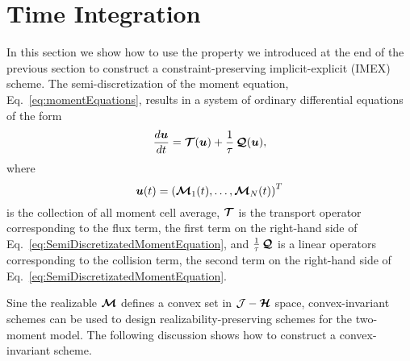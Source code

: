 \section{Time Integration} \label{se:TimeIntegration}

In this section we show how to use the property we introduced at the end of the previous section to construct a constraint-preserving implicit-explicit (IMEX) scheme.
The semi-discretization of the moment equation, Eq.~\eqref{eq:momentEquations}, results in a system of ordinary differential equations of the form
\begin{equation}
  \dfrac{d \boldsymbol{u}}{d t} = \boldsymbol{\mathcal{T}}(\boldsymbol{u}) + \frac{1}{\tau}\,\boldsymbol{\mathcal{Q}}(\boldsymbol{u}),
\end{equation}
where
\begin{equation}
\boldsymbol{u}(t) = \left( \boldsymbol{\mathcal{M}}_{1}(t),\ldots,\boldsymbol{\mathcal{M}}_{N}(t)\right) ^{T}
\end{equation}
is the collection of all moment cell average, $\boldsymbol{\mathcal{T}}$ is the transport operator corresponding to the flux term, the first term on the right-hand side of Eq.~\eqref{eq:SemiDiscretizatedMomentEquation}, and $\frac{1}{\tau}\,\boldsymbol{\mathcal{Q}}$ is a linear operators corresponding to the collision term, the second term on the right-hand side of Eq.~\eqref{eq:SemiDiscretizatedMomentEquation}.

Sine the realizable $\boldsymbol{\mathcal{M}}$ defines a convex set in $\mathcal{J} -\boldsymbol{\mathcal{H}}$ space, convex-invariant schemes can be used to design realizability-preserving schemes for the two-moment model.
The following discussion shows how to construct a convex-invariant scheme.

